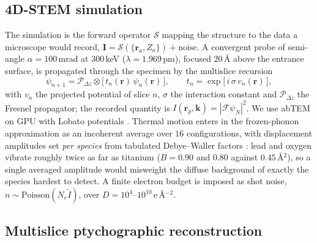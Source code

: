 \documentclass[aps,prb,twocolumn,superscriptaddress,floatfix,nofootinbib]{revtex4-2}
\begin{document}
\subsection{4D-STEM simulation}

The simulation is the forward operator $\mathcal{S}$ mapping the structure to the data a
microscope would record, $\mathbf{I}=\mathcal{S}(\{\mathbf{r}_a,Z_a\})+\text{noise}$. A
convergent probe of semi-angle $\alpha=100$\,mrad at $300$\,keV ($\lambda=1.969$\,pm), focused
$20$\,\AA{} above the entrance surface, is propagated through the specimen by the multislice
recursion \citep{CowleyMoodie1957,Kirkland2010}
\begin{equation}
  \psi_{n+1} = \mathcal{P}_{\Delta z}\!\otimes\!\big[\,t_n(\mathbf{r})\,\psi_n(\mathbf{r})\,\big],
  \qquad t_n = \exp\!\big[\,i\,\sigma\, v_n(\mathbf{r})\,\big],
  \label{eq:multislice}
\end{equation}
with $v_n$ the projected potential of slice $n$, $\sigma$ the interaction constant and
$\mathcal{P}_{\Delta z}$ the Fresnel propagator; the recorded quantity is
$I(\mathbf{r}_p,\mathbf{k})=|\mathcal{F}\psi_N|^2$. We use abTEM \citep{MadsenSusi2021} on GPU
with Lobato potentials \citep{LobatoVanDyck2014}. Thermal motion enters in the frozen-phonon
approximation \citep{LoaneXuSilcox1991} as an incoherent average over $16$ configurations, with
displacement amplitudes set \emph{per species} from tabulated Debye--Waller factors
\citep{Peng1996}: lead and oxygen vibrate roughly twice as far as titanium ($B=0.90$ and $0.80$
against $0.45$\,\AA$^2$), so a single averaged amplitude would misweight the diffuse background
of exactly the species hardest to detect. A finite electron budget is imposed as shot noise,
$n \sim \mathrm{Poisson}(N_e\tilde I)$, over $D=10^{4}$--$10^{10}$\,e\,\AA$^{-2}$.

\subsection{Multislice ptychographic reconstruction}
\end{document}

